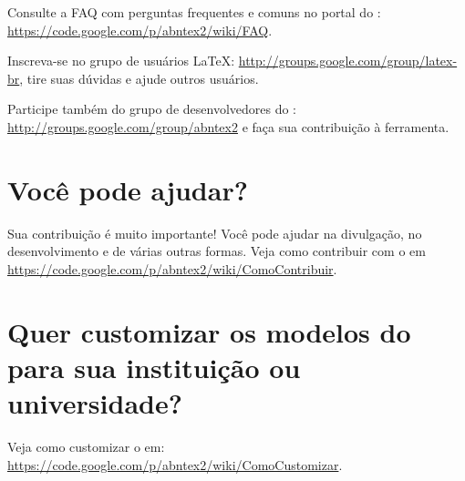 Consulte a FAQ com perguntas frequentes e comuns no portal do \abnTeX{}:
\url{https://code.google.com/p/abntex2/wiki/FAQ}.

Inscreva-se no grupo de usuários \LaTeX{}:
\url{http://groups.google.com/group/latex-br}, tire suas dúvidas e ajude
outros usuários.

Participe também do grupo de desenvolvedores do \abnTeX{}:
\url{http://groups.google.com/group/abntex2} e faça sua contribuição à
ferramenta.

\section{Você pode ajudar?}

Sua contribuição é muito importante! Você pode ajudar na divulgação, no
desenvolvimento e de várias outras formas. Veja como contribuir com o \abnTeX{}
em \url{https://code.google.com/p/abntex2/wiki/ComoContribuir}.

\section{Quer customizar os modelos do \texorpdfstring{\newline}{}\abnTeX{} para
    sua instituição ou universidade?}

Veja como customizar o \abnTeX{} em:
\url{https://code.google.com/p/abntex2/wiki/ComoCustomizar}.
